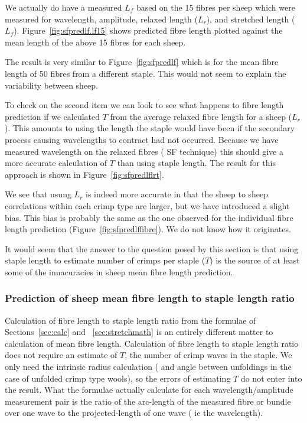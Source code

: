 \documentclass[titlepage,10pt]{article}  %
\begin{document}
We actually do have a measured $L_{f}$ based on the 15 fibres per sheep which were measured for wavelength, amplitude, relaxed length ($L_{r}$), and stretched length ($L_{f}$). Figure~\ref{fig:sfpredlf.lf15} shows predicted fibre length plotted against the mean length of the above 15 fibres for each sheep.

The result is very similar to Figure~\ref{fig:sfpredlf} which is for the mean fibre length of 50 fibres from a different staple. This would not seem to explain the variability between sheep.

To check on the second item we can look to see what happens to fibre length prediction if we calculated $T$ from the average relaxed fibre length for a sheep ($L_{r}$). This amounts to using the length the staple would have been if the secondary process causing wavelengths to contract had not occurred. Because we have measured wavelength on the relaxed fibres ( SF technique) this should give a more accurate calculation of $T$ than using staple length. The result for this approach is shown in Figure~\ref{fig:sfpredlflrt}.

We see that usung $L_{r}$ is indeed more accurate in that the sheep to sheep correlations within each crimp type are larger, but we have introduced a slight bias. This bias is probably the same as the one observed for the individual fibre length prediction (Figure~\ref{fig:sfpredlffibre}). We do not know how it originates.


It would seem that the answer to the question posed by this section is that using staple length to estimate number of crimps per staple ($T$) is the source of at least some of the innacuracies in sheep mean fibre length prediction. 

\subsubsection{Prediction of sheep mean fibre length to staple length ratio}
 Calculation of fibre length to staple length ratio from the formulae of Sections~\ref{sec:calc} and ~\ref{sec:stretchmath} is an entirely different matter to calculation of mean fibre length. Calculation of fibre length to staple length ratio does not require an estimate of $T$, the number of crimp waves in the staple. We only need the intrinsic radius calculation ( and angle between unfoldings in the case of unfolded crimp type wools), so the errors of estimating $T$ do not enter into the result. What the formulae actually calculate for each wavelength/amplitude measurement pair is the ratio of the arc-length of the measured fibre or bundle over one wave to the projected-length of one wave ( ie the wavelength). 
\end{document}
